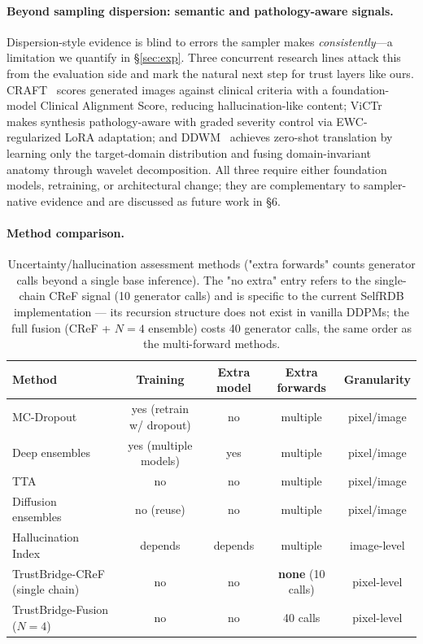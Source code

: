 \paragraph{Beyond sampling dispersion: semantic and pathology-aware signals.}
Dispersion-style evidence is blind to errors the sampler makes
\emph{consistently}---a limitation we quantify in \S\ref{sec:exp}. Three
concurrent research lines attack this from the evaluation side and mark the
natural next step for trust layers like ours. CRAFT~\cite{chung2026craft}
scores generated images against clinical criteria with a foundation-model
Clinical Alignment Score, reducing hallucination-like content; ViCTr~\cite{susladkar2025victr}
makes synthesis pathology-aware with graded severity control via EWC-regularized
LoRA adaptation; and DDWM~\cite{li2025ddwm} achieves zero-shot translation by
learning only the target-domain distribution and fusing domain-invariant
anatomy through wavelet decomposition. All three require either foundation
models, retraining, or architectural change; they are complementary to
sampler-native evidence and are discussed as future work in \S6.

\paragraph{Method comparison.}
\begin{table}[h]
\centering\small
\caption{Uncertainty/hallucination assessment methods ("extra forwards" counts
generator calls beyond a single base inference). The "no extra" entry refers
to the single-chain CReF signal (10 generator
calls) and is specific to the current SelfRDB implementation --- its recursion
structure does not exist in vanilla DDPMs; the full fusion (CReF + $N{=}4$
ensemble) costs 40 generator calls, the same order as the multi-forward
methods.}
\label{tab:rw}
\begin{tabular}{lcccc}
\toprule
Method & Training & Extra model & Extra forwards & Granularity \\
\midrule
MC-Dropout~\cite{gal2016mcdropout} & yes (retrain w/ dropout) & no & multiple & pixel/image \\
Deep ensembles~\cite{lakshminarayanan2017ensembles} & yes (multiple models) & yes & multiple & pixel/image \\
TTA~\cite{ayhan2018tta} & no & no & multiple & pixel/image \\
Diffusion ensembles~\cite{wolleb2022diffusionensembles,osuna2024microscopy} & no (reuse) & no & multiple & pixel/image \\
Hallucination Index~\cite{tivnan2024hallucinationindex} & depends & depends & multiple & image-level \\
TrustBridge-CReF (single chain) & no & no & \textbf{none} (10 calls) & pixel-level \\
TrustBridge-Fusion ($N{=}4$) & no & no & 40 calls & pixel-level \\
\bottomrule
\end{tabular}
\end{table}
